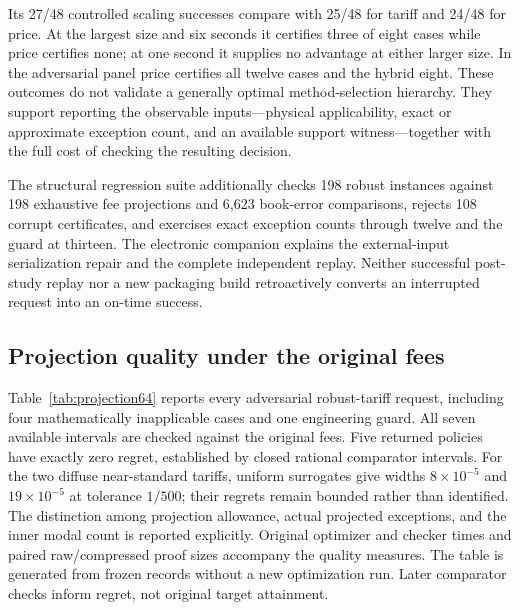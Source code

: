 Its 27/48 controlled scaling successes compare with 25/48 for tariff and 24/48 for price. At the largest size and six seconds it certifies three of eight cases while price certifies none; at one second it supplies no advantage at either larger size. In the adversarial panel price certifies all twelve cases and the hybrid eight. These outcomes do not validate a generally optimal method-selection hierarchy. They support reporting the observable inputs---physical applicability, exact or approximate exception count, and an available support witness---together with the full cost of checking the resulting decision.

The structural regression suite additionally checks 198 robust instances against 198 exhaustive fee projections and 6,623 book-error comparisons, rejects 108 corrupt certificates, and exercises exact exception counts through twelve and the guard at thirteen. The electronic companion explains the external-input serialization repair and the complete independent replay. Neither successful post-study replay nor a new packaging build retroactively converts an interrupted request into an on-time success.

\subsection{Projection quality under the original fees}\label{sec:projection-study64}
Table~\ref{tab:projection64} reports every adversarial robust-tariff request, including four mathematically inapplicable cases and one engineering guard. All seven available intervals are checked against the original fees. Five returned policies have exactly zero regret, established by closed rational comparator intervals. For the two diffuse near-standard tariffs, uniform surrogates give widths $8\times10^{-5}$ and $19\times10^{-5}$ at tolerance $1/500$; their regrets remain bounded rather than identified. The distinction among projection allowance, actual projected exceptions, and the inner modal count is reported explicitly. Original optimizer and checker times and paired raw/compressed proof sizes accompany the quality measures. The table is generated from frozen records without a new optimization run. Later comparator checks inform regret, not original target attainment.

